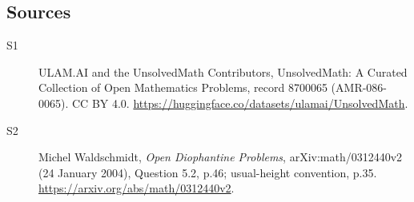 \documentclass[11pt]{article}
\begin{document}
\subsection{Sources}
\begin{description}
\item[\hypertarget{source:8700065:1}{S1}] ULAM.AI and the UnsolvedMath Contributors, UnsolvedMath: A Curated Collection of Open Mathematics Problems, record 8700065 (AMR-086-0065). CC BY 4.0. \url{https://huggingface.co/datasets/ulamai/UnsolvedMath}.
\item[\hypertarget{source:8700065:2}{S2}] Michel Waldschmidt, \emph{Open Diophantine Problems}, arXiv:math/0312440v2 (24 January 2004), Question 5.2, p.46; usual-height convention, p.35. \url{https://arxiv.org/abs/math/0312440v2}.
\end{description}
\label{end:8700065}
\end{document}
